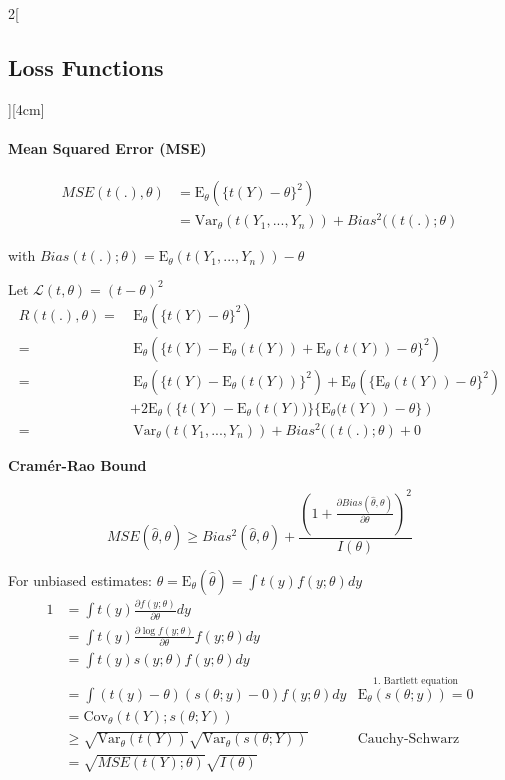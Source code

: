 \documentclass[8pt]{extarticle}
\begin{document}
\begin{multicols}{2}[\subsection{Loss Functions}][4cm]
\paragraph{Mean Squared Error (MSE)}
\begin{align*}
MSE(t(.), \theta) &= \mathrm{E}_\theta\left(\{t(Y)-\theta\}^2\right) \\
&=\mathrm{Var}_\theta\left(t(Y_1,...,Y_n)\right) + Bias^2((t(.); \theta)
\end{align*}

\noindent with $Bias(t(.);\theta) = \mathrm{E}_\theta\left(t(Y_1,...,Y_n)\right)-\theta$

\begin{Proof}
Let $\mathcal{L}(t, \theta) = (t-\theta)^2$
\begin{align*}
R(t(.), \theta) = &\: \mathrm{E}_\theta (\{t(Y) -\theta\}^2) \\
= &\: \mathrm{E}_\theta (\{t(Y) - \mathrm{E}_\theta(t(Y)) + \mathrm{E}_\theta(t(Y))-\theta\}^2) \\
= &\: \mathrm{E}_\theta (\{t(Y) - \mathrm{E}_\theta(t(Y))\}^2) +
\mathrm{E}_\theta (\{\mathrm{E}_\theta(t(Y))-\theta\}^2) \\
& +  2\mathrm{E}_\theta (\{t(Y)-\mathrm{E}_\theta \left(t(Y))\}\{\mathrm{E}_\theta (t(Y)\right)-\theta\}) \\
= &\: \mathrm{Var}_\theta(t(Y_1,...,Y_n)) + Bias^2((t(.); \theta) + 0
\end{align*}
\end{Proof}

\textbf{Cramér-Rao Bound}

$$MSE(\hat{\theta}, \theta) \geq Bias^2(\hat{\theta},\theta) + 
\frac{\left(1+
\frac{\partial Bias(\hat{\theta}, \theta)}{\partial \theta}
\right)^2}{I(\theta)}$$

\begin{Proof}
For unbiased estimates: $ \theta = \mathrm{E}_\theta(\hat{\theta}) = \int t(y)f(y;\theta)dy$
\begin{align*}
1 &= \int t(y) \frac{\partial f(y;\theta)}{\partial \theta} dy \\
&= \int t(y) \frac{\partial \log f(y;\theta)}{\partial \theta} f(y;\theta) dy \\
&= \int t(y) s(y;\theta) f(y;\theta) dy \\
&= \int \left( t(y)-\theta\right)\left(s(\theta;y)-0\right)f(y;\theta)dy
& \overset{\text{1. Bartlett equation}}{\mathrm{E}_\theta \left(s(\theta;y)\right) = 0}\\
&= \mathrm{Cov}_\theta\left(t(Y);s(\theta;Y)\right) \\
&\geq \sqrt{\mathrm{Var}_\theta(t(Y))} \sqrt{\mathrm{Var}_\theta(s(\theta;Y))} & \text{Cauchy-Schwarz} \\
&= \sqrt{MSE(t(Y);\theta)} \sqrt{I(\theta)}
\end{align*}
\end{Proof}


\end{multicols}
\end{document}
